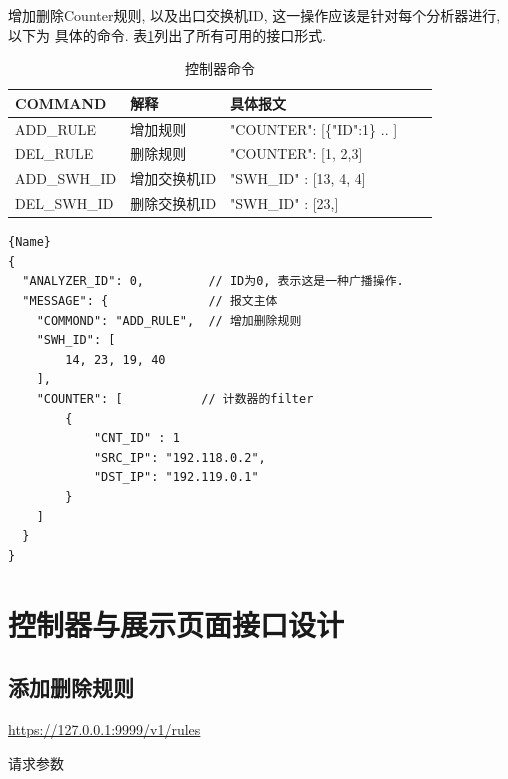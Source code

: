 增加删除Counter规则, 以及出口交换机ID, 这一操作应该是针对每个分析器进行, 以下为
具体的命令. 表\ref{tbl:message}列出了所有可用的接口形式.


\begin{table}[]
    \centering
    \caption{控制器命令}
    \label{tbl:message}
    \begin{tabular}{lllll} \hline
    COMMAND      & 解释         & 具体报文                         \\ \hline
    ADD\_RULE    & 增加规则     & "COUNTER": {[}\{"ID":1\} .. {]}  \\
    DEL\_RULE    & 删除规则     & "COUNTER": {[}1, 2,3{]}          \\
    ADD\_SWH\_ID & 增加交换机ID & "SWH\_ID" : {[}13, 4, 4{]}       \\
    DEL\_SWH\_ID & 删除交换机ID & "SWH\_ID" : {[}23,{]}            \\ \hline
    \end{tabular}
\end{table}

\begin{lstlisting}[caption=控制器增加删除规则]{Name}
{
  "ANALYZER_ID": 0,         // ID为0, 表示这是一种广播操作.
  "MESSAGE": {              // 报文主体
    "COMMOND": "ADD_RULE",  // 增加删除规则
    "SWH_ID": [
        14, 23, 19, 40
    ],
    "COUNTER": [           // 计数器的filter
        {
            "CNT_ID" : 1
            "SRC_IP": "192.118.0.2",
            "DST_IP": "192.119.0.1"
        }
    ]
  }
}
\end{lstlisting}

\section{控制器与展示页面接口设计}

\subsection{添加删除规则}

\url{https://127.0.0.1:9999/v1/rules}

请求参数


